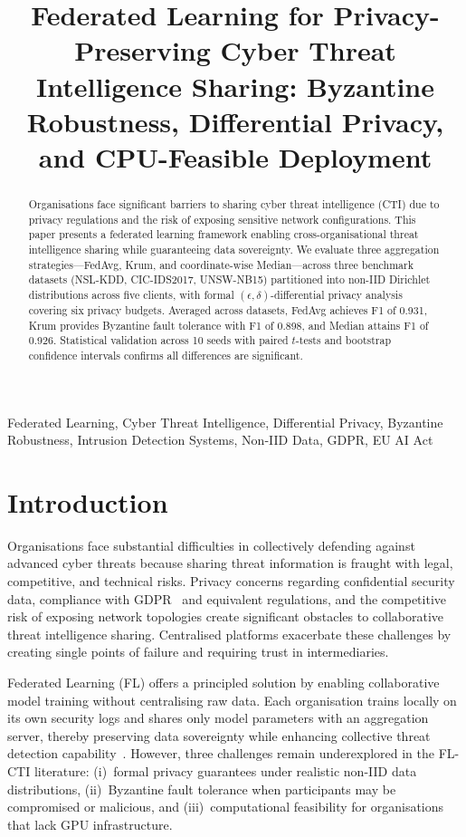 \documentclass[conference]{IEEEtran}
\title{Federated Learning for Privacy-Preserving Cyber Threat
Intelligence Sharing: Byzantine Robustness, Differential Privacy,
and CPU-Feasible Deployment}
\author{%
\IEEEauthorblockN{Arun Teja Dadala}
\IEEEauthorblockA{Student ID: x25101013\\
H9AIMLC -- AI/ML in Cybersecurity\\
National College of Ireland\\
Dublin, Ireland\\
x25101013@student.ncirl.ie}
}
\begin{document}
\maketitle

\begin{abstract}
Organisations face significant barriers to sharing cyber threat intelligence (CTI) due to privacy regulations and the risk of exposing sensitive network configurations. This paper presents a federated learning framework enabling cross-organisational threat intelligence sharing while guaranteeing data sovereignty. We evaluate three aggregation strategies---FedAvg, Krum, and coordinate-wise Median---across three benchmark datasets (NSL-KDD, CIC-IDS2017, UNSW-NB15) partitioned into non-IID Dirichlet distributions across five clients, with formal $(\epsilon,\delta)$-differential privacy analysis covering six privacy budgets. Averaged across datasets, FedAvg achieves F1 of 0.931, Krum provides Byzantine fault tolerance with F1 of 0.898, and Median attains F1 of 0.926. Statistical validation across 10 seeds with paired $t$-tests and bootstrap confidence intervals confirms all differences are significant.
\end{abstract}

\begin{IEEEkeywords}
Federated Learning, Cyber Threat Intelligence, Differential Privacy,
Byzantine Robustness, Intrusion Detection Systems, Non-IID Data,
GDPR, EU AI Act
\end{IEEEkeywords}

\section{Introduction}

Organisations face substantial difficulties in collectively defending
against advanced cyber threats because sharing threat information is
fraught with legal, competitive, and technical risks.
Privacy concerns regarding confidential security data, compliance with
GDPR~\cite{gdpr2016} and equivalent regulations, and the competitive risk of exposing
network topologies create significant obstacles to collaborative threat
intelligence sharing.
Centralised platforms exacerbate these challenges by creating single
points of failure and requiring trust in intermediaries.

Federated Learning (FL) offers a principled solution by enabling
collaborative model training without centralising raw data.
Each organisation trains locally on its own security logs and shares
only model parameters with an aggregation server, thereby preserving
data sovereignty while enhancing collective threat detection
capability~\cite{mcmahan2017,buyuktanir2025}.
However, three challenges remain underexplored in the FL-CTI
literature: (i)~formal privacy guarantees under realistic
non-IID data distributions, (ii)~Byzantine fault tolerance when
participants may be compromised or malicious, and (iii)~computational
feasibility for organisations that lack GPU infrastructure.
\end{document}
